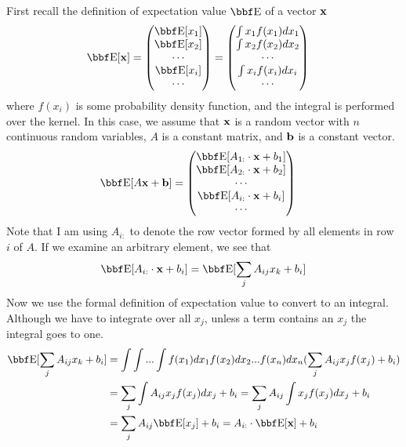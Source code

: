 \documentclass[12pt,letterpaper]{hmcpset}
\begin{document}
\begin{solution}
First recall the definition of expectation value $\EE$ of a vector ${\bf x}$
\begin{align*}
    \EE[\xx] & = \begin{pmatrix}\EE[x_1] \\ \EE[x_2] \\ \cdots \\ \EE[x_i]\\ \cdots \end{pmatrix} = \begin{pmatrix}\int x_1 f(x_1)dx_1 \\ \int x_2 f(x_2)dx_2 \\ \cdots \\ \int x_i f(x_i)dx_i\\ \cdots \end{pmatrix}
\end{align*}
where $f(x_i)$ is some probability density function, and the integral is performed over the kernel. In this case, we assume that ${\bf x}$ is a random vector with $n$ continuous random variables, $A$ is a constant matrix, and ${\bf b}$ is a constant vector.
\begin{align*}
    \EE[A\xx + \bb] &= \begin{pmatrix}\EE[A_{1:}\cdot\xx + b_1] \\ \EE[A_{2:}\cdot\xx + b_2] \\ \cdots \\ \EE[A_{i:}\cdot\xx + b_i]\\ \cdots \end{pmatrix}
\end{align*}
Note that I am using $A_{i:}$ to denote the row vector formed by all elements in row $i$ of $A$. If we examine an arbitrary element, we see that
\begin{align*}
    \EE[A_{i:}\cdot\xx + b_i] = \EE[\sum_j A_{ij}x_k + b_i] \\
\end{align*}
Now we use the formal definition of expectation value to convert to an integral. Although we have to integrate over all $x_j$, unless a term contains an $x_j$ the integral goes to one.
\begin{align*}
    \EE[\sum_j A_{ij}x_k + b_i] &= \int\int...\int f(x_1)dx_1f(x_2)dx_2...f(x_n)dx_n(\sum_j A_{ij} x_j f(x_j) + b_i) \\
    &= \sum_j \int A_{ij}x_jf(x_j) dx_j + b_i = \sum_j A_{ij}\int x_jf(x_j) dx_j + b_i \\
    &= \sum_j A_{ij} \EE[x_j] + b_i = A_{i:}\cdot \EE[\xx] + b_i

\end{align*}
\end{solution}
\end{document}
